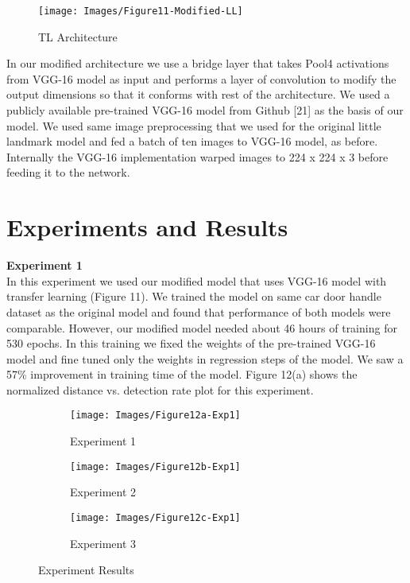 \documentclass [11pt,letterpaper ,twoside ,openany ]{report}
\begin{document}
    \begin{figure}[h]
      \centering
      \texttt{[image: Images/Figure11-Modified-LL]}
      \caption{TL Architecture}
      \label{fig:tl_arch}
    \end{figure}        

    In our modified architecture we use a bridge layer that takes Pool4 activations from VGG-16 model as input and performs a layer of convolution to modify the output dimensions so that it conforms with rest of the architecture. We used a publicly available pre-trained VGG-16 model from Github [21] as the basis of our model. We used same image preprocessing that we used for the original little landmark model and fed a batch of ten images to VGG-16 model, as before. Internally the VGG-16 implementation warped images to 224 x 224 x 3 before feeding it to the network.    

    \section{Experiments and Results}

    \noindent
    \textbf{Experiment 1}\\    
    In this experiment we used our modified model that uses VGG-16 model with transfer learning (Figure 11). We trained the model on same car door handle dataset as the original  model and found that performance of both models were comparable. However, our modified model needed about 46 hours of training for 530 epochs. In this training we fixed the weights of the pre-trained VGG-16 model and fine tuned only the weights in regression steps of the model. We saw a 57\% improvement in training time of the model. Figure 12(a) shows the normalized distance vs. detection rate plot for this experiment.

    \begin{wrapfigure}{l}[9mm]{0.5\textwidth}
        \begin{subfigure}[b]{\linewidth}
            \texttt{[image: Images/Figure12a-Exp1]}
            \caption{Experiment 1}
        \end{subfigure}
        \begin{subfigure}[b]{\linewidth}
            \texttt{[image: Images/Figure12b-Exp1]}
            \caption{Experiment 2}
        \end{subfigure}
        \begin{subfigure}[b]{\linewidth}
            \texttt{[image: Images/Figure12c-Exp1]}
            \caption{Experiment 3}
        \end{subfigure}        
        \caption{Experiment Results}
    \end{wrapfigure}   
\end{document}
